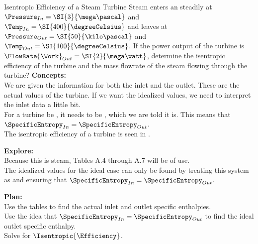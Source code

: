 \begin{example}{Isentropic Efficiency of a Steam Turbine}
  Steam enters an   steadily at $\Pressure_{In} = \SI{3}{\mega\pascal}$ and $\Temp_{In} = \SI{400}{\degreeCelsius}$ and leaves at $\Pressure_{Out} = \SI{50}{\kilo\pascal}$ and $\Temp_{Out} = \SI{100}{\degreeCelsius}$.
  If the power output of the turbine is $\FlowRate{\Work}_{Out}= \SI{2}{\mega\watt}$, determine the isentropic efficiency of the turbine and the mass flowrate of the steam flowing through the turbine?
  \tcblower{}
  \textbf{Concepts:} \\
  We are given the information for both the inlet and the outlet.
  These are the actual values of the turbine.
  If we want the idealized values, we need to interpret the inlet data a little bit. \\
  For a turbine be , it needs to be , which we are told it is.
  This means that $\SpecificEntropy_{In} = \SpecificEntropy_{Out}$. \\
  The isentropic efficiency of a turbine is seen in .

  \textbf{Explore:} \\
  Because this is steam, Tables A.4 through A.7 will be of use. \\
  The idealized values for the ideal case can only be found by treating this system as  and ensuring that $\SpecificEntropy_{In} = \SpecificEntropy_{Out}$.

  \textbf{Plan:} \\
  Use the tables to find the actual inlet and outlet specific enthalpies. \\
  Use the idea that $\SpecificEntropy_{In} = \SpecificEntropy_{Out}$ to find the ideal outlet specific enthalpy. \\
  Solve  for $\Isentropic{\Efficiency}$.
\end{example}

